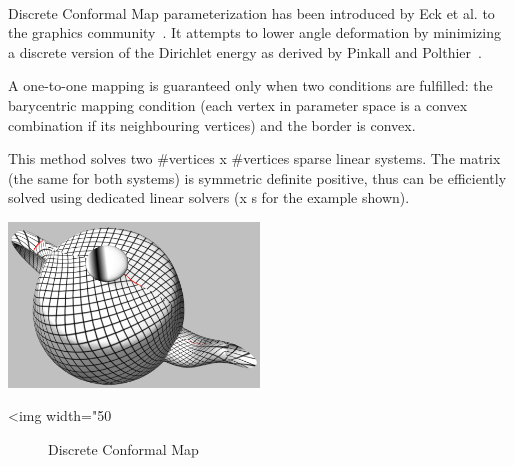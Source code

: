   \\

Discrete Conformal Map parameterization has been introduced by Eck et
al. to the graphics community~\cite{cgal:eddhls-maam-95}. It attempts to
lower angle deformation by minimizing a discrete version of the
Dirichlet energy as derived by Pinkall and
Polthier~\cite{cgal:fh-survey-05}.


A one-to-one mapping is guaranteed only when two conditions are
fulfilled: the barycentric mapping condition (each vertex in parameter
space is a convex combination if its neighbouring vertices) and the
border is convex.


This method solves two \#vertices x \#vertices sparse linear
systems. The matrix (the same for both systems) is symmetric definite
positive, thus can be efficiently solved using dedicated linear
solvers (x s for the example shown).

\begin{center}
    \label{Surface_mesh_parameterization-fig-conformal}
    \begin{ccTexOnly}
        \includegraphics[width=0.5\textwidth]{Surface_mesh_parameterization/conformal} %
    \end{ccTexOnly}
    \begin{ccHtmlOnly}
        <img width="50%
    \end{ccHtmlOnly}
    \begin{figure}[h]
        \caption{Discrete Conformal Map}
    \end{figure}
\end{center}


